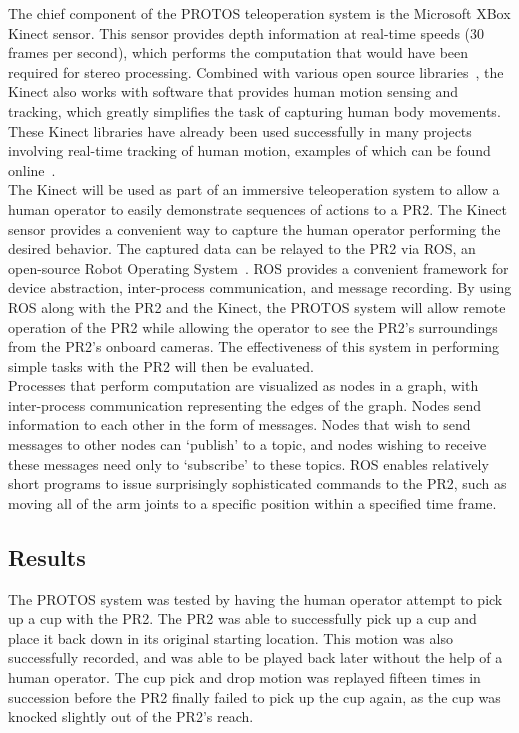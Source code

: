 \documentclass{sig-alternate}
\begin{document}
\indent The chief component of the PROTOS teleoperation system is the Microsoft XBox Kinect sensor. This sensor provides depth information at real-time speeds
(30 frames per second), which performs the computation that would have been required for stereo 
processing. Combined with various open source libraries~\cite{kinect}, the Kinect also works with 
software that provides human motion sensing and tracking, which greatly simplifies the task of capturing human body movements.\\

These Kinect libraries have already been used successfully in 
many projects involving real-time tracking of human motion, examples of which can be found online~\cite{freenect}.\\

\indent The Kinect will be used as part of an immersive teleoperation system to allow a human operator to easily demonstrate sequences of actions
to a PR2.
The Kinect sensor provides a convenient way to capture the human operator performing the desired behavior. The captured data can be relayed to the
PR2 via ROS, an open-source Robot Operating System~\cite{ros}. ROS provides a 
convenient framework for device abstraction, inter-process communication, and message recording.
By using ROS along with the PR2 and the Kinect, the PROTOS system will allow remote operation of the PR2 while
allowing the operator to see the PR2's surroundings from the PR2's onboard cameras. The effectiveness of this system in performing simple tasks with the PR2 
will then be evaluated. \\

Processes that perform computation are visualized as nodes in a graph, with inter-process communication representing the
edges of the graph. Nodes send information to each other in the form of messages. Nodes that wish to send messages to other nodes can
`publish' to a topic, and nodes wishing to receive these messages need only to `subscribe' to these topics. ROS enables relatively short
programs to issue surprisingly sophisticated commands to the PR2, such as moving all of the arm joints to a specific position within a
specified time frame. \\

\subsection{Results}
\indent The PROTOS system was tested by having the human operator attempt to pick up a cup with the PR2. The PR2 was able to successfully pick up a cup and 
place it back down in its original starting location. This motion was also successfully recorded, and was able to be played back later without the help of a human operator.
The cup pick and drop motion was replayed fifteen times in succession before the PR2 finally failed to pick up the cup again, as the cup was knocked slightly out of
the PR2's reach.
\end{document}
